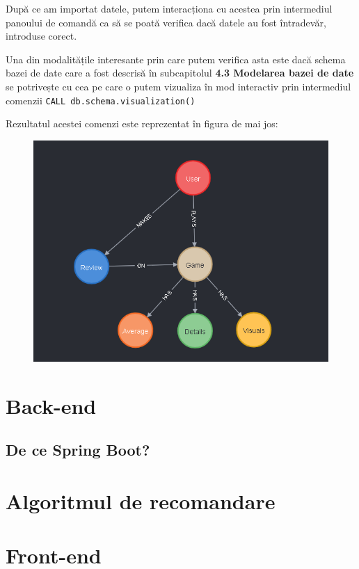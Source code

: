 \documentclass[12pt,a4paper]{report}
\begin{document}
După ce am importat datele, putem interacționa cu acestea prin intermediul panoului de comandă ca să se poată verifica dacă datele au fost întradevăr, introduse corect.

Una din modalitățile interesante prin care putem verifica asta este dacă schema bazei de date care a fost descrisă în subcapitolul \textbf{4.3 Modelarea bazei de date } se potrivește cu cea pe care o putem vizualiza în mod interactiv prin intermediul comenzii \texttt{CALL db.schema.visualization()}

Rezultatul acestei comenzi este reprezentat în figura de mai jos:

\begin{figure}[H]
\centering
\caption{}
\includegraphics[scale = 0.7]{exemplu_16_schema}
\caption*{}
\end{figure}



\section{Back-end}

\subsection{De ce Spring Boot?}
\section{Algoritmul de recomandare}
\section{Front-end}
\end{document}
